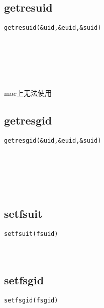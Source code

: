 \documentclass[10pt,a4paper]{article}
\begin{document}
\subsection{getresuid}
\begin{spacing}{2.0}
\lstset{language=C,numbers=none}
\begin{lstlisting}
getresuid(&uid,&euid,&suid)
\end{lstlisting}
{\large\color[rgb]{0.2,0.4,0.6}{\&uid:}} \\
{\large\color[rgb]{0.2,0.4,0.6}{\&euid:}} \\
{\large\color[rgb]{0.2,0.4,0.6}{\&suid:}}
\paragraph{ \ \ }mac上无法使用
\end{spacing}

\subsection{getresgid}
\begin{spacing}{2.0}
\lstset{language=C,numbers=none}
\begin{lstlisting}
getresgid(&uid,&euid,&suid)
\end{lstlisting}
{\large\color[rgb]{0.2,0.4,0.6}{\&uid:}} \\
{\large\color[rgb]{0.2,0.4,0.6}{\&euid:}} \\
{\large\color[rgb]{0.2,0.4,0.6}{\&suid:}}
\paragraph{ \ \ }
\end{spacing}

\subsection{setfsuit}
\begin{spacing}{2.0}
\lstset{language=C,numbers=none}
\begin{lstlisting}
setfsuit(fsuid)
\end{lstlisting}
{\large\color[rgb]{0.2,0.4,0.6}{fsuid:}}
\paragraph{ \ \ }
\end{spacing}

\subsection{setfsgid}
\begin{spacing}{2.0}
\lstset{language=C,numbers=none}
\begin{lstlisting}
setfsgid(fsgid)
\end{lstlisting}
{\large\color[rgb]{0.2,0.4,0.6}{fsgid:}}
\paragraph{ \ \ }
\end{spacing}
\end{document}
